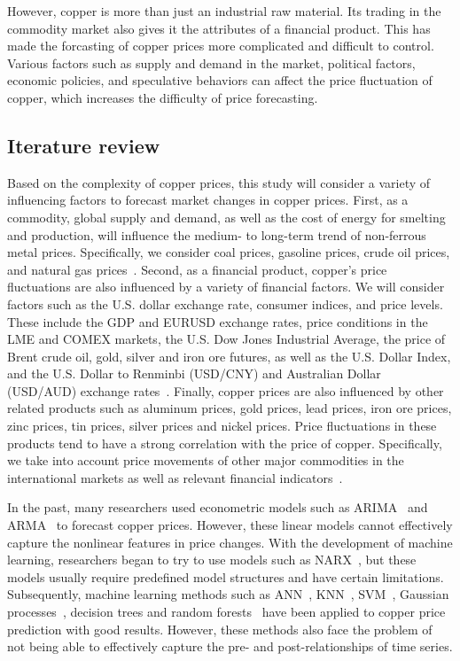 \documentclass[project-plan]{report-template}
\begin{document}
\noindent However, copper is more than just an industrial raw material. Its trading in the commodity market also gives it the attributes of a financial product. This has made the forcasting of copper prices more complicated and difficult to control. Various factors such as supply and demand in the market, political factors, economic policies, and speculative behaviors can affect the price fluctuation of copper, which increases the difficulty of price forecasting.

\subsection{Iterature review}
\noindent Based on the complexity of copper prices, this study will consider a variety of influencing factors to forecast market changes in copper prices. First, as a commodity, global supply and demand, as well as the cost of energy for smelting and production, will influence the medium- to long-term trend of non-ferrous metal prices. Specifically, we consider coal prices, gasoline prices, crude oil prices, and natural gas prices~\cite{behmiri2015role}.
Second, as a financial product, copper's price fluctuations are also influenced by a variety of financial factors. We will consider factors such as the U.S. dollar exchange rate, consumer indices, and price levels. These include the GDP and EURUSD exchange rates, price conditions in the LME and COMEX markets, the U.S. Dow Jones Industrial Average, the price of Brent crude oil, gold, silver and iron ore futures, as well as the U.S. Dollar Index, and the U.S. Dollar to Renminbi (USD/CNY) and Australian Dollar (USD/AUD) exchange rates~\cite{frankel2010determinants, ciner2017predicting}.
Finally, copper prices are also influenced by other related products such as aluminum prices, gold prices, lead prices, iron ore prices, zinc prices, tin prices, silver prices and nickel prices. Price fluctuations in these products tend to have a strong correlation with the price of copper. Specifically, we take into account price movements of other major commodities in the international markets as well as relevant financial indicators~\cite{ozdemir2022medium, BUNCIC20151}.

\noindent In the past, many researchers used econometric models such as ARIMA~\cite{Asteriou2016ARIMAMA} and ARMA~\cite{whittle1951hypothesis} to forecast copper prices. However, these linear models cannot effectively capture the nonlinear features in price changes. With the development of machine learning, researchers began to try to use models such as NARX~\cite{lin1996learning, diaconescu2008use}, but these models usually require predefined model structures and have certain limitations. Subsequently, machine learning methods such as ANN~\cite{ZHANG2021102189}, KNN~\cite{altman1992introduction, chen2007narx}, SVM~\cite{cortes1995support}, Gaussian processes~\cite{frigola2013integrated}, decision trees and random forests~\cite{breiman2001random, diaz2020random} have been applied to copper price prediction with good results. However, these methods also face the problem of not being able to effectively capture the pre- and post-relationships of time series.
\end{document}
